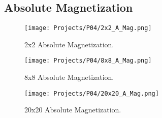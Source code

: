\documentclass[a4paper]{article}
\begin{document}
\begin{appendix}
\subsection*{Absolute Magnetization}


\begin{figure}[H]
  \centering
  \texttt{[image: Projects/P04/2x2\_A\_Mag.png]}
  \caption{2x2 Absolute Magnetization.}
  \label{2x2_A_Mag}
\end{figure}
\begin{figure}[H]
  \centering
  \texttt{[image: Projects/P04/8x8\_A\_Mag.png]}
  \caption{8x8 Absolute Magnetization.}
  \label{8x8_A_Mag}
\end{figure}
\begin{figure}[H]
  \centering
  \texttt{[image: Projects/P04/20x20\_A\_Mag.png]}
  \caption{20x20 Absolute Magnetization.}
  \label{20x20_A_Mag}
\end{figure}










\end{appendix}
\end{document}
